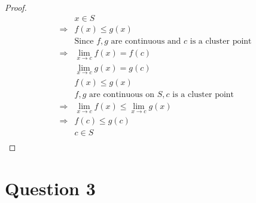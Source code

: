 \documentclass{article}
\begin{document}
~

\begin{proof}
    \begin{align*}
        &x\in S\\
        \Rightarrow&f(x)\leqslant g(x)\\
        &\text{Since }f,g\text{ are continuous and }c\text{ is a cluster point}\\
        \Rightarrow&\lim_{x\to c}f(x)=f(c)\\
        &\lim_{x\to c}g(x)=g(c)\\
        &f(x)\leqslant g(x)\\
        &f,g\text{ are continuous on }S,c\text{ is a cluster point}\\
        \Rightarrow&\lim_{x\to c}f(x)\leqslant\lim_{x\to c}g(x)\\
        \Rightarrow&f(c)\leqslant g(c)\\
        &c\in S\\
    \end{align*}
\end{proof}

\newpage

\section*{Question 3}

~
\end{document}
